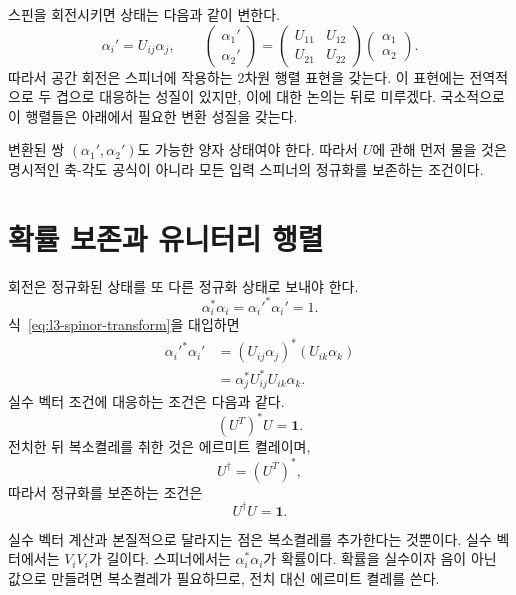 스핀을 회전시키면 상태는 다음과 같이 변한다.
\begin{equation}
\alpha_i'=U_{ij}\alpha_j,
\qquad
\begin{pmatrix}\alpha_1'\\\alpha_2'\end{pmatrix}
=
\begin{pmatrix}
U_{11}&U_{12}\\
U_{21}&U_{22}
\end{pmatrix}
\begin{pmatrix}\alpha_1\\\alpha_2\end{pmatrix}.
\label{eq:l3-spinor-transform}
\end{equation}
따라서 공간 회전은 스피너에 작용하는 2차원 행렬 표현을 갖는다. 이 표현에는 전역적으로 두 겹으로 대응하는 성질이 있지만, 이에 대한 논의는 뒤로 미루겠다. 국소적으로 이 행렬들은 아래에서 필요한 변환 성질을 갖는다.

변환된 쌍 \((\alpha_1',\alpha_2')\)도 가능한 양자 상태여야 한다. 따라서 \(U\)에 관해 먼저 물을 것은 명시적인 축-각도 공식이 아니라 모든 입력 스피너의 정규화를 보존하는 조건이다.

\section{확률 보존과 유니터리 행렬}

회전은 정규화된 상태를 또 다른 정규화 상태로 보내야 한다.
\begin{equation}
\alpha_i^*\alpha_i=\alpha_i'^*\alpha_i'=1.
\end{equation}
식~\eqref{eq:l3-spinor-transform}을 대입하면
\begin{align}
\alpha_i'^*\alpha_i'
 &=(U_{ij}\alpha_j)^*(U_{ik}\alpha_k)\\
 &=\alpha_j^*U_{ij}^*U_{ik}\alpha_k.
\end{align}
실수 벡터 조건에 대응하는 조건은 다음과 같다.
\begin{equation}
(U^T)^*U=\boldsymbol 1.
\end{equation}
전치한 뒤 복소켤레를 취한 것은 에르미트 켤레이며,
\begin{equation}
U^\dagger=(U^T)^*,
\end{equation}
따라서 정규화를 보존하는 조건은
\begin{equation}
U^\dagger U=\boldsymbol 1.
\label{eq:l3-unitarity}
\end{equation}

실수 벡터 계산과 본질적으로 달라지는 점은 복소켤레를 추가한다는 것뿐이다. 실수 벡터에서는 \(V_iV_i\)가 길이다. 스피너에서는 \(\alpha_i^*\alpha_i\)가 확률이다. 확률을 실수이자 음이 아닌 값으로 만들려면 복소켤레가 필요하므로, 전치 대신 에르미트 켤레를 쓴다.

